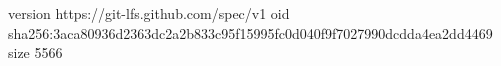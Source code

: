version https://git-lfs.github.com/spec/v1
oid sha256:3aca80936d2363dc2a2b833c95f15995fc0d040f9f7027990dcdda4ea2dd4469
size 5566
